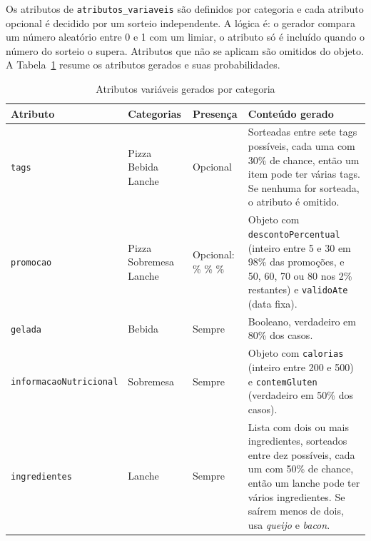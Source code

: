 Os atributos de \texttt{atributos\_variaveis} são definidos por categoria e cada atributo 
opcional é decidido por um sorteio independente. A lógica é: o gerador compara um número 
aleatório entre 0 e 1 com um limiar, o atributo só é incluído quando o número do sorteio 
o supera. Atributos que não se aplicam são omitidos do objeto. A Tabela~\ref{tab:probabilidades} 
resume os atributos gerados e suas probabilidades.

\begin{table}[H]
    \centering
    \renewcommand{\arraystretch}{1.1}
    \caption{Atributos variáveis gerados por categoria}
    \label{tab:probabilidades}
    \small
    \begin{tabular}{|>{\raggedright\arraybackslash}p{3.3cm}|>{\raggedright\arraybackslash}p{2.7cm}|>{\raggedright\arraybackslash}p{3.1cm}|>{\raggedright\arraybackslash}p{5.2cm}|}
        \hline
        \textbf{Atributo} & \textbf{Categorias} & \textbf{Presença} & \textbf{Conteúdo gerado} \\ \hline
        \texttt{tags} & Pizza \newline Bebida \newline Lanche & Opcional & Sorteadas entre sete tags possíveis, cada uma com 30\% de chance, então um item pode ter várias tags. Se nenhuma for sorteada, o atributo é omitido. \\ \hline
        \texttt{promocao} & Pizza \newline Sobremesa \newline Lanche & Opcional: \newline 40\% \newline 30\% \newline 35\% & Objeto com \texttt{descontoPercentual} (inteiro entre 5 e 30 em 98\% das promoções, e 50, 60, 70 ou 80 nos 2\% restantes) e \texttt{validoAte} (data fixa). \\ \hline
        \texttt{gelada} & Bebida & Sempre & Booleano, verdadeiro em 80\% dos casos. \\ \hline
        \texttt{informacao\allowbreak Nutricional} & Sobremesa & Sempre & Objeto com \texttt{calorias} (inteiro entre 200 e 500) e \texttt{contemGluten} (verdadeiro em 50\% dos casos). \\ \hline
        \texttt{ingredientes} & Lanche & Sempre & Lista com dois ou mais ingredientes, sorteados entre dez possíveis, cada um com 50\% de chance, então um lanche pode ter vários ingredientes. Se saírem menos de dois, usa \textit{queijo} e \textit{bacon}. \\ \hline
    \end{tabular}
    \vspace{0.4em}
\end{table}


